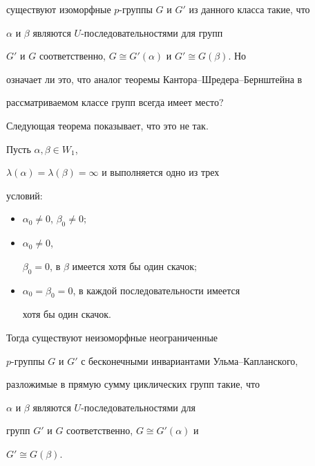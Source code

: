 существуют изоморфные $p$-группы $G$ и $G'$ из данного класса такие, что


$\alpha$ и $\beta$ являются $U$-последовательностями для групп


$G'$ и $G$ соответственно, $G\cong G'(\alpha)$ и $G'\cong G(\beta)$. Но


означает ли это, что аналог теоремы Кантора--Шредера--Бернштейна в


рассматриваемом классе групп всегда имеет место?


Следующая теорема показывает, что это не так.





\begin{thms}


Пусть $\alpha,\beta\in W_1$,


$\lambda(\alpha)=\lambda(\beta)=\infty$ и выполняется одно из трех


условий\/$:$


\begin{itemize}


\item[1)] $\alpha_0\neq 0$, $\beta_0\neq 0;$


\item[2)] $\alpha_0\neq 0$,


$\beta_0=0$, в $\beta$ имеется хотя бы один скачок\/$;$


\item[3)] $\alpha_0=\beta_0=0$, в каждой последовательности имеется


хотя бы один скачок.


\end{itemize}





Тогда существуют неизоморфные неограниченные


$p$-группы $G$ и $G'$ с бесконечными инвариантами Ульма--Капланского,


разложимые в прямую сумму циклических групп такие, что


$\alpha$ и $\beta$ являются $U$-последовательностями для


групп $G'$ и $G$ соответственно, $G\cong G'(\alpha)$ и


$G'\cong G(\beta)$.


\end{thms}





